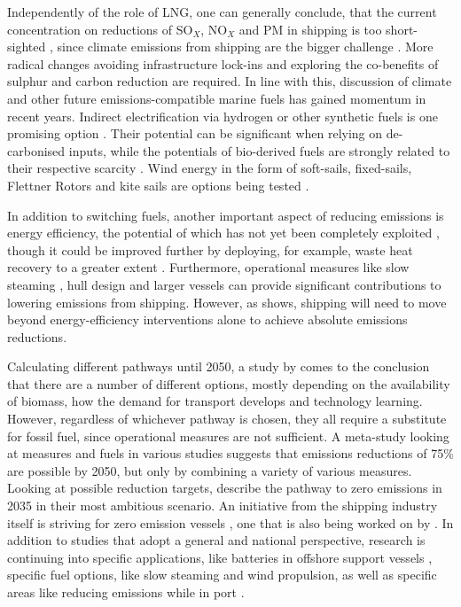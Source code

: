 \documentclass[article]{elsarticle}
\begin{document}
Independently of the role of LNG, one can generally conclude, that the current concentration on reductions of SO$_X$, NO$_X$ and PM in shipping is too short-sighted \cite{Gilbert2014}, since climate emissions from shipping are the bigger challenge \cite{FRIDELL2019}. More radical changes avoiding infrastructure lock-ins and exploring the co-benefits of sulphur and carbon reduction are required.
In line with this, discussion of climate and other future emissions-compatible marine fuels has gained momentum in recent years. Indirect electrification via hydrogen or other synthetic fuels is one promising option \cite{HORVATH2018}. Their potential can be significant when relying on de-carbonised inputs, while the potentials of bio-derived fuels are strongly related to their respective scarcity \cite{Gilbert2014}. Wind energy in the form of soft-sails, fixed-sails, Flettner Rotors and kite sails are options being tested \cite{IRENA2015}.

In addition to switching fuels, another important aspect of reducing emissions is energy efficiency, the potential of which has not yet been completely exploited \cite{JAFARZADEH2014,CHI2018}, though it could be improved further by deploying, for example, waste heat recovery to a greater extent \cite{Baldi2015}. Furthermore, operational measures like slow steaming \cite{ARMSTRONG2013}, hull design and larger vessels \cite{LINDSTAD2015} can provide significant contributions to lowering emissions from shipping. However, as \citet{Olmer2017} shows, shipping will need to move beyond energy-efficiency interventions alone to achieve absolute emissions reductions.

Calculating different pathways until 2050, a study by \citet{LloydsRegister2016} comes to the conclusion that there are a number of different options, mostly depending on the availability of biomass, how the demand for transport develops and technology learning. However, regardless of whichever pathway is chosen, they all require a substitute for fossil fuel, since operational measures are not sufficient. A meta-study looking at measures and fuels in various studies \cite{Bouman2017} suggests that emissions reductions of 75\% are possible by 2050, but only by combining a variety of various measures. Looking at possible reduction targets, \citet{Smith2016} describe the pathway to zero emissions in 2035 in their most ambitious scenario. An initiative from the shipping industry itself is striving for zero emission vessels \cite{SSI2018}, one that is also being worked on by \citet{LloydsRegister2017}.
In addition to studies that adopt a general and national perspective, research is continuing into specific applications, like batteries in offshore support vessels \cite{Lindstad2017}, specific fuel options, like slow steaming and wind propulsion, \cite{MANDER2017} as well as specific areas like reducing emissions while in port \cite{WINNES2015}.
\end{document}
